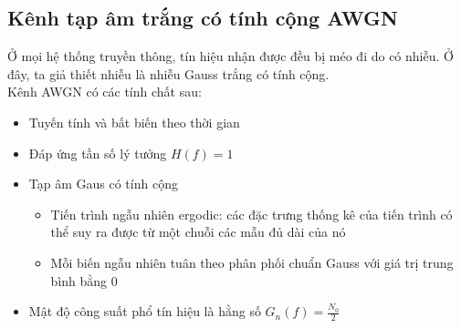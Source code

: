 \subsection{Kênh tạp âm trắng có tính cộng AWGN}
Ở mọi hệ thống truyền thông, tín hiệu nhận được đều bị méo đi do có nhiễu. Ở đây, ta giả thiết nhiễu là nhiễu Gauss trắng có tính cộng. \\
Kênh AWGN có các tính chất sau:
\begin{itemize}
    \item Tuyến tính và bất biến theo thời gian
    \item Đáp ứng tần số lý tưởng $H(f) = 1$
    \item Tạp âm Gaus có tính cộng 
    \begin{itemize}
        \item Tiến trình ngẫu nhiên ergodic: các đặc trưng thống kê của tiến trình có thể suy ra được từ một chuỗi các mẫu đủ dài của nó
        \item Mỗi biến ngẫu nhiên tuân theo phân phối chuẩn Gauss với giá trị trung bình bằng 0
    \end{itemize}
    \item Mật độ công suất phổ tín hiệu là hằng số $G_{n}(f) = \frac{N_{0}}{2}$
    
\end{itemize}

